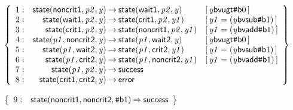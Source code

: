 \documentclass[a4paper]{article}
\def\lthtmlcheckvsize{\ifdim\ht\sizebox<\vsize 
  \ifdim\wd\sizebox<\hsize\expandafter\hfill\fi \expandafter\vfill
  \else\expandafter\vss\fi}%
\begin{document}
{\newpage\clearpage
{}%
$\displaystyle \left\{
\begin{array}{rr@{\>}c@{\>}ll}
\mathrm{1} : 
 & \mathsf{state}(\mathsf{noncrit1},\mathit{p2},\mathit{y})
 & \to 
 & \mathsf{state}(\mathsf{wait1},\mathit{p2},\mathit{y})
 & [\, \mathit{y} \mathsf{bvugt} {\mbox{\tt\symbol{35}}\mathsf{b}{0}} \,]\\
\par
\mathrm{2} : 
 & \mathsf{state}(\mathsf{wait1},\mathit{p2},\mathit{y})
 & \to 
 & \mathsf{state}(\mathsf{crit1},\mathit{p2},\mathit{y1})
 & [\, \mathit{y1} = (\mathit{y} \mathsf{bvsub} {\mbox{\tt\symbol{35}}\mathsf{b}{1}}) \,]\\
\par
\mathrm{3} : 
 & \mathsf{state}(\mathsf{crit1},\mathit{p2},\mathit{y})
 & \to 
 & \mathsf{state}(\mathsf{noncrit1},\mathit{p2},\mathit{y1})
 & [\, \mathit{y1} = (\mathit{y} \mathsf{bvadd} {\mbox{\tt\symbol{35}}\mathsf{b}{1}}) \,]\\
\par
\mathrm{4} : 
 & \mathsf{state}(\mathit{p1},\mathsf{noncrit2},\mathit{y})
 & \to 
 & \mathsf{state}(\mathit{p1},\mathsf{wait2},\mathit{y})
 & [\, \mathit{y} \mathsf{bvugt} {\mbox{\tt\symbol{35}}\mathsf{b}{0}} \,]\\
\par
\mathrm{5} : 
 & \mathsf{state}(\mathit{p1},\mathsf{wait2},\mathit{y})
 & \to 
 & \mathsf{state}(\mathit{p1},\mathsf{crit2},\mathit{y1})
 & [\, \mathit{y1} = (\mathit{y} \mathsf{bvsub} {\mbox{\tt\symbol{35}}\mathsf{b}{1}}) \,]\\
\par
\mathrm{6} : 
 & \mathsf{state}(\mathit{p1},\mathsf{crit2},\mathit{y})
 & \to 
 & \mathsf{state}(\mathit{p1},\mathsf{noncrit2},\mathit{y1})
 & [\, \mathit{y1} = (\mathit{y} \mathsf{bvadd} {\mbox{\tt\symbol{35}}\mathsf{b}{1}}) \,]\\
\par
\mathrm{7} : 
 & \mathsf{state}(\mathit{p1},\mathit{p2},\mathit{y})
 & \to 
 & \mathsf{success}\\
\par
\mathrm{8} : 
 & \mathsf{state}(\mathsf{crit1},\mathsf{crit2},\mathit{y})
 & \to 
 & \mathsf{error}\\
\par
\end{array}
\right\}
$%
\lthtmlindisplaymathZ
\lthtmlcheckvsize\clearpage}

{\newpage\clearpage
{}%
$\displaystyle \left\{
\begin{array}{rr@{\>}c@{\>}ll}
\mathrm{9} : 
 & \mathsf{state}(\mathsf{noncrit1},\mathsf{noncrit2},{\mbox{\tt\symbol{35}}\mathsf{b}{1}})
 & \Rightarrow 
 & \mathsf{success}\\
\par
\end{array}
\right\}
$%
\lthtmlindisplaymathZ
\lthtmlcheckvsize\clearpage}
\end{document}
